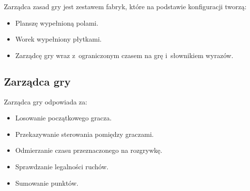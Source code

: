 \documentclass[a4paper,10pt]{report}
\begin{document}
Zarządca zasad gry jest zestawem fabryk, które na podstawie konfiguracji tworzą:

\begin{itemize}
 \item Planszę wypełnioną polami.
 \item Worek wypełniony płytkami.
 \item Zarządcę gry wraz z~ograniczonym czasem na grę i~słownikiem wyrazów.
\end{itemize}

\subsection{Zarządca gry}

Zarządca gry odpowiada za:

\begin{itemize}
 \item Losowanie początkowego gracza.
 \item Przekazywanie sterowania pomiędzy graczami.
 \item Odmierzanie czasu przeznaczonego na rozgrywkę.
 \item Sprawdzanie legalności ruchów.
 \item Sumowanie punktów.
\end{itemize}
\end{document}
